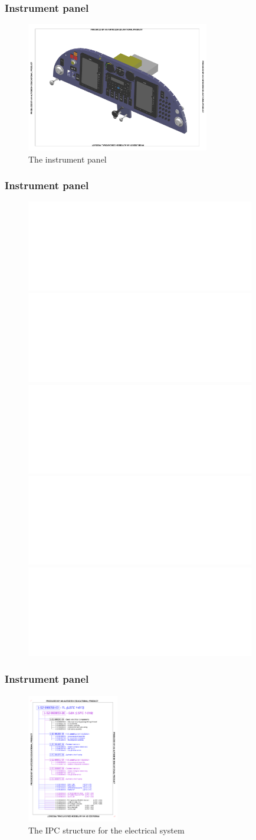 \documentclass{beamer}
\begin{document}
\begin{frame}\frametitle{Instrument panel}
\begin{figure}[ht!]
	\begin{center}
		\includegraphics[width=8cm,trim = 4cm 4.cm 4cm 4.cm, clip]{pics/PIC030.pdf}
		\caption{The instrument panel}
		\label{fig:PIC030one}
	\end{center}
\end{figure}
\end{frame}

\begin{frame}\frametitle{Instrument panel}
\begin{figure}[ht!]
	\begin{center}
		\includegraphics<1>[width=10cm,trim = 2.8cm 2.8cm 2.8cm 2.8cm, clip]{pics/PIC034.pdf}
		\label{fig:PIC034}
		\includegraphics<2>[width=10cm,trim = 2cm 2cm 2cm 2cm, clip]{pics/PIC033.pdf}
		\label{fig:PIC033}
		\includegraphics<3>[width=10cm,trim = 2cm 2cm 2cm 2cm, clip]{pics/PIC032.pdf}
		\label{fig:PIC032}
		\includegraphics<4>[width=10cm,trim = 2cm 2cm 2cm 2cm, clip]{pics/PIC031.pdf}
		\label{fig:PIC031}
		\includegraphics<5>[width=10cm,trim = 2cm 2cm 2cm 2cm, clip]{pics/PIC030.pdf}
		\label{fig:PIC030}
	\end{center}
\end{figure}
\end{frame}

\begin{frame}\frametitle{Instrument panel}
\begin{figure}[ht!]
	\begin{center}
		\includegraphics[width=4cm,trim = 1.9cm 2.4cm 1.9cm 2.4cm, clip]{pics/PIC015.pdf}
		\caption{The IPC structure for the electrical system}
		\label{fig:PIC015}
	\end{center}
\end{figure}
\end{frame}
\end{document}
